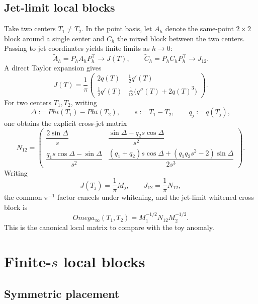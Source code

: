 \documentclass[11pt,a4paper]{amsart}
\def\Omega{Omega}%
\def\Phi{Phi}%
\theoremstyle{plain}
\theoremstyle{definition}
\newcommand{\Ph}{\Phi}
\begin{document}
\subsection{Jet-limit local blocks}

Take two centers $T_1\neq T_2$. In the point basis, let $A_h$ denote the same-point $2\times 2$ block around a single center and $C_h$ the mixed block between the two centers. Passing to jet coordinates yields finite limits as $h\to 0$:
\[
\widetilde A_h=P_hA_hP_h^\top \to J(T),
\qquad
\widetilde C_h=P_hC_hP_h^\top \to J_{12}.
\]
A direct Taylor expansion gives
\begin{equation}\label{eq:J-T}
J(T)=\frac1\pi
\begin{pmatrix}
2q(T) & \frac12 q'(T)\\[1ex]
\frac12 q'(T) & \frac1{12}\bigl(q''(T)+2q(T)^3\bigr)
\end{pmatrix}.
\end{equation}
For two centers $T_1,T_2$, writing
\[
\Delta:=\Ph(T_1)-\Ph(T_2),
\qquad s:=T_1-T_2,
\qquad q_j:=q(T_j),
\]
one obtains the explicit cross-jet matrix
\begin{equation}\label{eq:N12}
N_{12}=
\begin{pmatrix}
\dfrac{2\sin \Delta}{s}
&
\dfrac{\sin \Delta-q_2 s\cos \Delta}{s^2}
\\[2ex]
\dfrac{q_1 s\cos \Delta-\sin \Delta}{s^2}
&
\dfrac{(q_1+q_2)s\cos \Delta+(q_1q_2s^2-2)\sin \Delta}{2s^3}
\end{pmatrix}.
\end{equation}
Writing
\[
J(T_j)=\frac1\pi M_j,
\qquad
J_{12}=\frac1\pi N_{12},
\]
the common $\pi^{-1}$ factor cancels under whitening, and the jet-limit whitened cross block is
\begin{equation}\label{eq:omega-infty}
\Omega_\infty(T_1,T_2)=M_1^{-1/2}N_{12}M_2^{-1/2}.
\end{equation}
This is the canonical local matrix to compare with the toy anomaly.

\section{Finite-\texorpdfstring{$s$}{s} local blocks}

\subsection{Symmetric placement}
\end{document}
